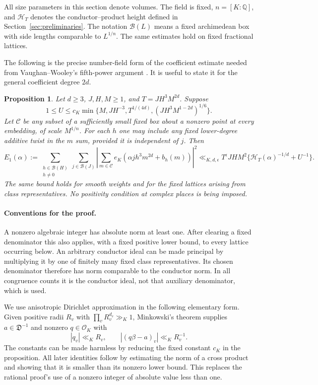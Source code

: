 \documentclass[11pt]{amsart}
\newtheorem{proposition}[theorem]{Proposition}
\theoremstyle{definition}
\numberwithin{equation}{section}
\begin{document}
All size parameters in this section denote volumes.  The field is fixed,
$n=[K:\mathbb Q]$, and $\mathcal H_T$ denotes the conductor--product height
defined in Section~\ref{sec:preliminaries}.  The notation $\mathcal B(L)$ means a fixed
archimedean box with side lengths comparable to $L^{1/n}$.  The same estimates hold on fixed fractional lattices.

The following is the precise number-field form of the coefficient estimate
needed from Vaughan--Wooley's fifth-power argument \cite[Lemma~4.3]{VW1995}.  It is useful to state
it for the general coefficient degree $2d$.

\begin{proposition}\label{prop:k5-coeff2}
Let $d\ge3$, $J,H,M\ge1$, and $T=JH^3M^{2d}$.  Suppose
\[
 1\le U\le c_K\min\{M,JH^{-3},T^{1/(4d)},
                  (JH^3M^{1-2d})^{1/6}\}.
\]
Let $\mathcal C$ be any subset of a sufficiently small fixed box about a
nonzero point at every embedding, of scale $M^{1/n}$.  For each $h$ one may
include any fixed lower-degree additive twist in the $m$ sum, provided it
is independent of $j$.  Then
\[
 E_1(\alpha):=\sum_{\substack{h\in\mathcal B(H)\\h\ne0}}
 \sum_{j\in\mathcal B(J)}
 \left|\sum_{m\in\mathcal C}e_K(\alpha jh^3m^{2d}+b_h(m))\right|^2
 \ll_{K,d,\epsilon}T^\epsilon JHM^2
       \{\mathcal H_T(\alpha)^{-1/d}+U^{-1}\}.
\]
The same bound holds for smooth weights and for the fixed lattices arising
from class representatives.  No positivity condition at complex places is
being imposed.
\end{proposition}

\paragraph{Conventions for the proof.}
A nonzero algebraic integer has absolute norm at least one.  After clearing
a fixed denominator this also applies, with a fixed positive lower bound,
to every lattice occurring below.  An arbitrary conductor ideal can be
made principal by multiplying it by one of finitely many fixed class
representatives.  Its chosen denominator therefore has norm comparable
to the conductor norm.  In all congruence counts it is the conductor ideal,
not that auxiliary denominator, which is used.

We use anisotropic Dirichlet approximation in the following elementary
form.  Given positive radii $R_v$ with $\prod_vR_v^{d_v}\gg_K1$, Minkowski's
theorem supplies $a\in\mathfrak D^{-1}$ and nonzero $q\in\mathcal O_K$ with
\[
 |q_v|\ll_KR_v,\qquad |(q\beta-a)_v|\ll_K R_v^{-1}.
\]
The constants can be made harmless by reducing the fixed constant $c_K$
in the proposition.  All later identities follow by estimating the norm
of a cross product and showing that it is smaller than its nonzero lower
bound.  This replaces the rational proof's use of a nonzero integer of
absolute value less than one.
\end{document}
